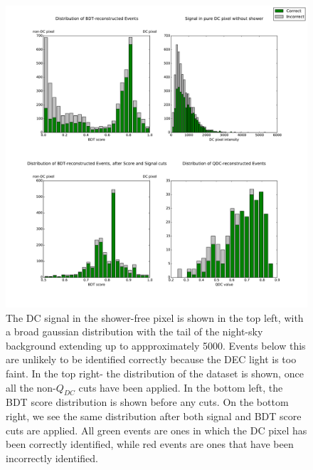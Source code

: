\documentclass{article}
\begin{document}
\begin{figure}
\begin{center}
\includegraphics[width=\textwidth]{cutdistribution1None}
\caption{The DC signal in the shower-free pixel is shown in the top left, with a broad gaussian distribution with the tail of the night-sky background extending up to appproximately 5000. Events below this are unlikely to be identified correctly because the DEC light is too faint. In the top right- the distribution of the dataset is shown, once all the non-$Q_{DC}$ cuts have been applied. In the bottom left, the BDT score distribution is shown before any cuts. On the bottom right, we see the same distribution after both signal and BDT score cuts are applied. All green events are ones in which the DC pixel has been correctly identified, while red events are ones that have been incorrectly identified.}
\label{fig:cutdistribution}
\end{center}
\end{figure}
\end{document}

